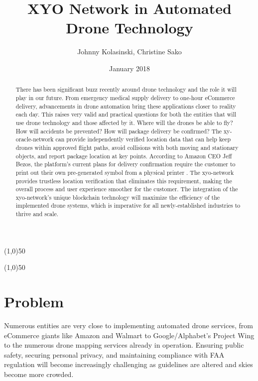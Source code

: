\documentclass{article}
\title {XYO Network in Automated Drone Technology}
\author{Johnny Kolasinski, Christine Sako}
\date{January 2018}
\begin{document}
\maketitle
\tableofcontents

\begin{center}
\line(1,0){50}
\end{center}

\begin{abstract}
There has been significant buzz recently around drone technology and the role it will play in our future. From emergency medical supply delivery to one-hour eCommerce delivery, advancements in drone automation bring these applications closer to reality each day. This raises very valid and practical questions for both the entities that will use drone technology and those affected by it. Where will the drones be able to fly? How will accidents be prevented? How will package delivery be confirmed? The \Gls{xy-oracle-network} can provide independently verified location data that can help keep drones within approved flight paths, avoid collisions with both moving and stationary objects, and report package location at key points. According to Amazon CEO Jeff Bezos, the platform's current plans for delivery confirmation require the customer to print out their own pre-generated symbol from a physical printer \cite{nickelsburg-amazondrones}. The \Gls{xyo-network} provides trustless location verification that eliminates this requirement, making the overall process and user experience smoother for the customer. The integration of the \Gls{xyo-network}'s unique blockchain technology will maximize the efficiency of the implemented drone systems, which is imperative for all newly-established industries to thrive and scale.

\end{abstract}

\begin{center}
\line(1,0){50}
\end{center}

\section {Problem}
Numerous entities are very close to implementing automated drone services, from eCommerce giants like Amazon and Walmart to Google/Alphabet's Project Wing to the numerous drone mapping services already in operation. Ensuring public safety, securing personal privacy, and maintaining compliance with FAA regulation will become increasingly challenging as guidelines are altered and skies become more crowded.
\end{document}
